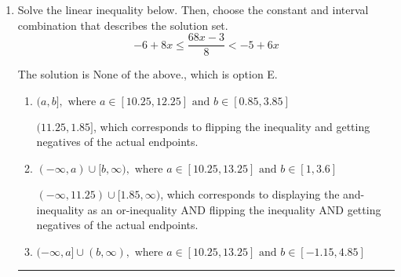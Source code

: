 \documentclass{extbook}[14pt]
\newcommand{\litem}[1]{\item #1

\rule{\textwidth}{0.4pt}}
\begin{document}
\begin{enumerate}
{\begin{enumerate}[label=\Alph*.]
 $(-1.766, \infty)$, which corresponds to negating the endpoint of the solution.
\item \( (-\infty, a), \text{ where } a \in [-0.23, 4.77] \)

 $(-\infty, 1.766)$, which corresponds to switching the direction of the interval. You likely did this if you did not flip the inequality when dividing by a negative!
\item \( (a, \infty), \text{ where } a \in [0.77, 3.77] \)

* $(1.766, \infty)$, which is the correct option.
\item \( (-\infty, a), \text{ where } a \in [-2.77, 1.23] \)

 $(-\infty, -1.766)$, which corresponds to switching the direction of the interval AND negating the endpoint. You likely did this if you did not flip the inequality when dividing by a negative as well as not moving values over to a side properly.
\item \( \text{None of the above}. \)

You may have chosen this if you thought the inequality did not match the ends of the intervals.
\end{enumerate}

\textbf{General Comment:} Remember that less/greater than or equal to includes the endpoint, while less/greater do not. Also, remember that you need to flip the inequality when you multiply or divide by a negative.
}
\litem{
Solve the linear inequality below. Then, choose the constant and interval combination that describes the solution set.
\[ -6 + 8 x \leq \frac{68 x - 3}{8} < -5 + 6 x \]

The solution is \( \text{None of the above.} \), which is option E.\begin{enumerate}[label=\Alph*.]
\item \( (a, b], \text{ where } a \in [10.25, 12.25] \text{ and } b \in [0.85, 3.85] \)

$(11.25, 1.85]$, which corresponds to flipping the inequality and getting negatives of the actual endpoints.
\item \( (-\infty, a) \cup [b, \infty), \text{ where } a \in [10.25, 13.25] \text{ and } b \in [1, 3.6] \)

$(-\infty, 11.25) \cup [1.85, \infty)$, which corresponds to displaying the and-inequality as an or-inequality AND flipping the inequality AND getting negatives of the actual endpoints.
\item \( (-\infty, a] \cup (b, \infty), \text{ where } a \in [10.25, 13.25] \text{ and } b \in [-1.15, 4.85] \)


\end{enumerate}}
\end{enumerate}
\end{document}
